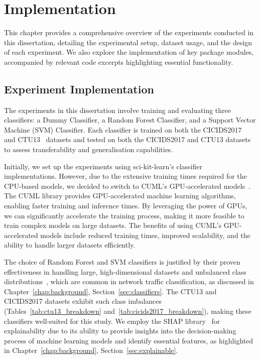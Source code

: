 \chapter{Implementation}\label{chap:implementation}

This chapter provides a comprehensive overview of the experiments conducted in this dissertation, detailing the experimental setup, dataset usage, and the design of each experiment. We also explore the implementation of key package modules, accompanied by relevant code excerpts highlighting essential functionality.

\section{Experiment Implementation}\label{sec:ExperimentImplementation}
The experiments in this dissertation involve training and evaluating three classifiers: a Dummy Classifier, a Random Forest Classifier, and a Support Vector Machine (SVM) Classifier. Each classifier is trained on both the CICIDS2017~\cite{sharafaldin2018toward} and CTU13~\cite{garcia2014empirical}  datasets and tested on both the CICIDS2017 and CTU13 datasets to assess transferability and generalisation capabilities.

Initially, we set up the experiments using sci-kit-learn's classifier implementations. However, due to the extensive training times required for the CPU-based models, we decided to switch to CUML's GPU-accelerated models~\cite{raschka2020machine}. The CUML library provides GPU-accelerated machine learning algorithms, enabling faster training and inference times. By leveraging the power of GPUs, we can significantly accelerate the training process, making it more feasible to train complex models on large datasets. The benefits of using CUML's GPU-accelerated models include reduced training times, improved scalability, and the ability to handle larger datasets efficiently.

The choice of Random Forest and SVM classifiers is justified by their proven effectiveness in handling large, high-dimensional datasets and unbalanced class distributions~\cite{farnaaz2016random, teng2017svm}, which are common in network traffic classification, as discussed in Chapter~\ref{chap:background}, Section~\ref{sec:classifiers}. The CTU13 and CICIDS2017 datasets exhibit such class imbalances (Tables~\ref{tab:ctu13_breakdown} and~\ref{tab:cicids2017_breakdown}), making these classifiers well-suited for this study. We employ the SHAP library~\cite{lundberg2017unified} for explainability due to its ability to provide insights into the decision-making process of machine learning models and identify essential features, as highlighted in Chapter~\ref{chap:background}, Section~\ref{sec:explainable}.

